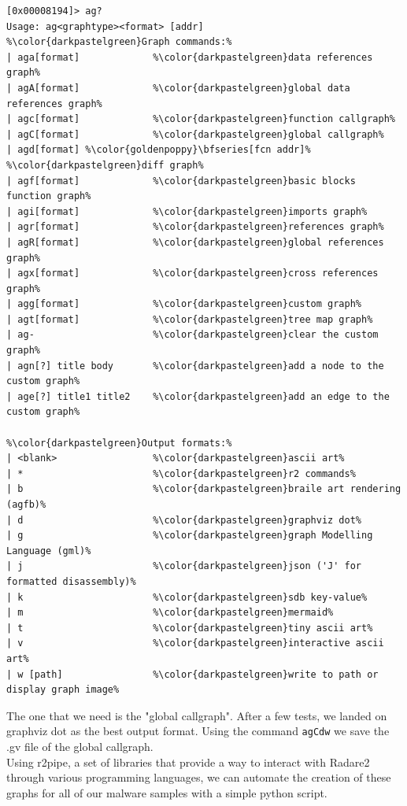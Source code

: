 \begin{center}
\begin{lstlisting}[style=Radare2,escapechar=\%,xleftmargin=.1\textwidth, xrightmargin=.03\textwidth]
[0x00008194]> ag?
Usage: ag<graphtype><format> [addr]
%\color{darkpastelgreen}Graph commands:%
| aga[format]             %\color{darkpastelgreen}data references graph%
| agA[format]             %\color{darkpastelgreen}global data references graph%
| agc[format]             %\color{darkpastelgreen}function callgraph%
| agC[format]             %\color{darkpastelgreen}global callgraph%
| agd[format] %\color{goldenpoppy}\bfseries[fcn addr]%    %\color{darkpastelgreen}diff graph%
| agf[format]             %\color{darkpastelgreen}basic blocks function graph%
| agi[format]             %\color{darkpastelgreen}imports graph%
| agr[format]             %\color{darkpastelgreen}references graph%
| agR[format]             %\color{darkpastelgreen}global references graph%
| agx[format]             %\color{darkpastelgreen}cross references graph%
| agg[format]             %\color{darkpastelgreen}custom graph%
| agt[format]             %\color{darkpastelgreen}tree map graph%
| ag-                     %\color{darkpastelgreen}clear the custom graph%
| agn[?] title body       %\color{darkpastelgreen}add a node to the custom graph%
| age[?] title1 title2    %\color{darkpastelgreen}add an edge to the custom graph%

%\color{darkpastelgreen}Output formats:%
| <blank>                 %\color{darkpastelgreen}ascii art%
| *                       %\color{darkpastelgreen}r2 commands%
| b                       %\color{darkpastelgreen}braile art rendering (agfb)%
| d                       %\color{darkpastelgreen}graphviz dot%
| g                       %\color{darkpastelgreen}graph Modelling Language (gml)%
| j                       %\color{darkpastelgreen}json ('J' for formatted disassembly)%
| k                       %\color{darkpastelgreen}sdb key-value%
| m                       %\color{darkpastelgreen}mermaid%
| t                       %\color{darkpastelgreen}tiny ascii art%
| v                       %\color{darkpastelgreen}interactive ascii art%
| w [path]                %\color{darkpastelgreen}write to path or display graph image%
\end{lstlisting}
\end{center}

\noindent The one that we need is the "global callgraph". After a few tests, we landed on graphviz dot as the best output format. Using the command \texttt{agCdw} we save the .gv file of the global callgraph. \\
Using r2pipe, a set of libraries that provide a way to interact with Radare2 through various programming languages, we can automate the creation of these graphs for all of our malware samples with a simple python script.

